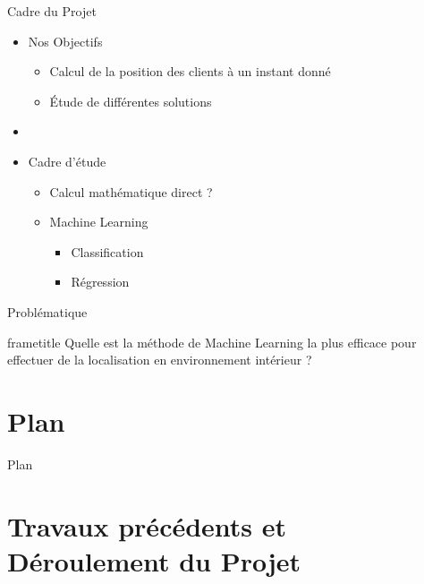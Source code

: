 \documentclass{beamer}
\begin{document}
\begin{frame}{Cadre du Projet}
  \begin{itemize}
    \item Nos Objectifs
    \begin{itemize}
      \item Calcul de la position des clients à un instant donné
      \item \'Etude de différentes solutions
    \end{itemize}
    \item[]
    \item Cadre d'étude
    \begin{itemize}
      \item Calcul mathématique direct ?
      \item Machine Learning
      \begin{itemize}
        \item Classification
        \item Régression
      \end{itemize}
    \end{itemize}
  \end{itemize}
\end{frame}

\begin{frame}{Problématique}
  \begin{beamercolorbox}[ht=5ex,dp=1.5ex,center]{frametitle}
    Quelle est la méthode de Machine Learning la plus efficace pour effectuer de la localisation en environnement intérieur ?
  \end{beamercolorbox}
\end{frame}

\section*{Plan}
\begin{frame}{Plan}
  \tableofcontents
\end{frame}

\section[Travaux précédents -- Déroulement]{Travaux précédents et Déroulement du Projet}

\subsection*{}
\end{document}
